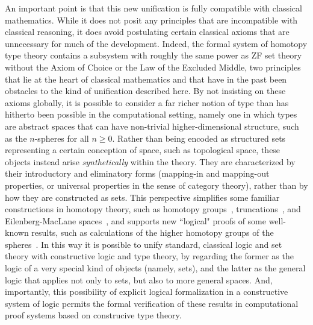 \documentclass[11pt]{article}
\theoremstyle{remark}
\theoremstyle{definition}
\begin{document}
An important point is that this new unification is fully compatible with classical mathematics.  While it does not posit any principles that are incompatible with classical reasoning, it does avoid postulating certain classical axioms that are unnecessary for much of the development. 
Indeed, the formal system of homotopy type theory contains a subsystem with roughly the same power as ZF set theory without the
Axiom of Choice or the Law of the Excluded Middle, two principles that lie at the heart of classical mathematics and that have in the past been obstacles to the kind of unification described here.  By not insisting on these axioms globally, it is possible to consider a far richer notion of type than has hitherto been possible in the computational setting, namely one in which types are abstract spaces that can have non-trivial higher-dimensional structure, such as the $n$-spheres for all $n\geq 0$.  Rather than being encoded as structured sets representing a certain conception of space, such as topological space, these objects instead arise \emph{synthetically} within the theory.  They are characterized by their introductory and eliminatory forms (mapping-in and mapping-out properties, or universal properties in the sense of category theory), rather than by how they are constructed as sets. This perspective simplifies some familiar constructions in homotopy theory, such as homotopy groups~\cite{HoTTbook,LS-Circ}, truncations~\cite{HoTTbook}, and Eilenberg-MacLane spaces~\cite{LF-EM}, and supports new ``logical" proofs 
of some well-known results, such as calculations of the higher homotopy groups of the spheres~\cite{LB-PinSn}.  
In this way it is possible to unify standard, classical logic and set theory with constructive logic and type theory, by regarding the former as the logic of a very special kind of objects (namely, sets), and the latter as the general logic that applies not only to sets, but also to more general spaces.  And, importantly, this possibility of explicit logical formalization in a constructive system of logic permits the formal verification of these results in computational proof systems based on construcive type theory.
\end{document}
